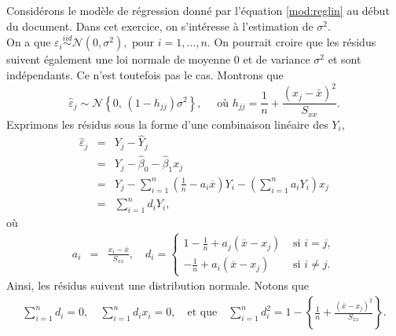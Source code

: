 \begin{questions}  

\vspace{1cm}
\question

Considérons le modèle de régression donné par l'équation \eqref{mod:reglin} au début du document. Dans cet exercice, on s'intéresse à l'estimation de $\sigma^2$. \\

On a que $\varepsilon_i \overset{iid}{\sim} \mathcal{N}(0, \sigma^2), \text{ pour } i=1,\ldots,n$. 
On pourrait croire que les résidus suivent également une loi normale de moyenne $0$ et de variance $\sigma^2$ et sont indépendants. Ce n'est toutefois pas le cas. Montrons que
\begin{equation*}
\widehat{\varepsilon}_j \sim \mathcal{N} \left\{0, \, (1-h_{jj})\sigma^2\right\}, \quad \mbox{ où } h_{jj}=\frac{1}{n}+\frac{(x_j - \bar x)^2}{S_{xx}}.
\end{equation*}
Exprimons les résidus sous la forme d'une combinaison linéaire des $Y_i$,
\begin{eqnarray*}
 \widehat{\varepsilon}_j &=& Y_j - \widehat{Y}_j\\
 &=& Y_j - \widehat{\beta}_0 - \widehat{\beta}_1 x_j\\
 &=& Y_j - \sum_{i=1}^n \left(\frac{1}{n} - a_i \overline{x}\right) Y_i - \left(\sum_{i=1}^n a_i Y_i\right) x_j \\
 &=& \sum_{i=1}^n d_i Y_i,
\end{eqnarray*}
où
\begin{eqnarray*}
a_i &= & \frac{\displaystyle x_i-\bar x}{\displaystyle S_{xx}}, \quad
d_i  =  \left\{
 \begin{array}{lc}
 \displaystyle 1-\frac{1}{n} + a_j (\overline{x}-x_j) & \mbox{ si } i=j, \\[4mm]
  \displaystyle     -\frac{1}{n} + a_i (\overline{x}-x_j) & \mbox{ si } i\neq j.
     \end{array}
     \right.
\end{eqnarray*}
Ainsi, les résidus suivent une distribution normale. Notons que
\begin{eqnarray*}
\sum_{i=1}^n d_i =   0, \quad \sum_{i=1}^n d_i x_i =   0, \quad \text{et que} \quad \sum_{i=1}^n d_i^2 = 1-\left\{\frac{1}{n}+\frac{(\bar x-x_j)^2}{S_{xx}}\right\}.
\end{eqnarray*}

\end{questions}
